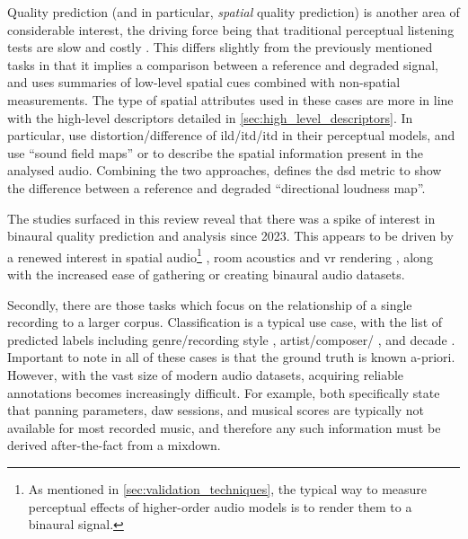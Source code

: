 \documentclass[referee,pdflatex,sn-mathphys-num]{sn-jnl}%
\newcommand{\q}[1]{\enquote{#1}}
\begin{document}
Quality prediction (and in particular, \textit{spatial} quality prediction) is another area of considerable interest, the driving force being that traditional perceptual listening tests are slow and costly \cite{engelAssessingHRTFPreprocessing2022,delgadoDesignChoicesBinaural2023}. This differs slightly from the previously mentioned tasks in that it implies a comparison between a reference and degraded signal, and uses summaries of low-level spatial cues combined with non-spatial measurements.  The type of spatial attributes used in these cases are more in line with the high-level descriptors detailed in \cref{sec:high_level_descriptors}. In particular, \cite{choiPredictionPerceivedQuality2007,choiObjectiveMeasurementPerceived2008,youSpatialLocalizationEvaluation2012,watcharasupatQuantifyingSpatialAudio2024} use distortion/difference of \gls{ild}/\gls{itd}/\gls{itd} in their perceptual models, and \cite{supperOnsetGuidedSpatialAnalyser2005,dewhirstModellingPerceivedSpatial2008} use \q{sound field maps} or  to describe the spatial information present in the analysed audio. Combining the two approaches, \cite{delgadoObjectiveAssessmentSpatial2019} defines the \gls{dsd} metric to show the difference between a reference and degraded \q{directional loudness map}.

The studies surfaced in this review reveal that there was a spike of interest in binaural quality prediction and analysis since 2023. This appears to be driven by a renewed interest in spatial audio\footnote{As mentioned in \cref{sec:validation_techniques}, the typical way to measure perceptual effects of higher-order audio models is to render them to a binaural signal.} \cite{delgadoDesignChoicesBinaural2023,stahlPerceptualComparisonParametric2023,pfanzagl-cardoneArtScience3D2023,bergnerIdentificationDiscriminativeAcoustic2023,kiyanPredictingImmersionSurround2023}, room acoustics \cite{tylerPredictingBinauralRoom2023,vonbergAnalysisPhysicalPerceptual2024} and \gls{vr} rendering \cite{marchanMultiLayeredArchitectureEfficient2023,politisWideArea6DOFRendering2023,yeLAVSSLocationGuidedAudioVisual2024}, along with the increased ease of gathering or creating binaural audio datasets.

Secondly, there are those tasks which focus on the relationship of a single recording to a larger corpus. Classification is a typical use case, with the list of predicted labels including genre/recording style \cite{tzanetakisStereoPanningFeatures2007,tzanetakisStereoPanningInformation2010,ziemerGoniometersArePowerful2023}, artist/composer/ \cite{tzanetakisStereoPanningInformation2010,ziemerAcousticFeaturesRecording2021}, and decade \cite{tardieuProductionEffectAudio2011}. Important to note in all of these cases is that the ground truth is known a-priori. However, with the vast size of modern audio datasets, acquiring reliable annotations becomes increasingly difficult. For example, \cite{colonelReverseEngineeringRecording2021,rodriguezSpectralDynamicConstellations2024} both specifically state that panning parameters, \gls{daw} sessions, and musical scores are typically not available for most recorded music, and therefore any such information must be derived after-the-fact from a mixdown.
\end{document}
